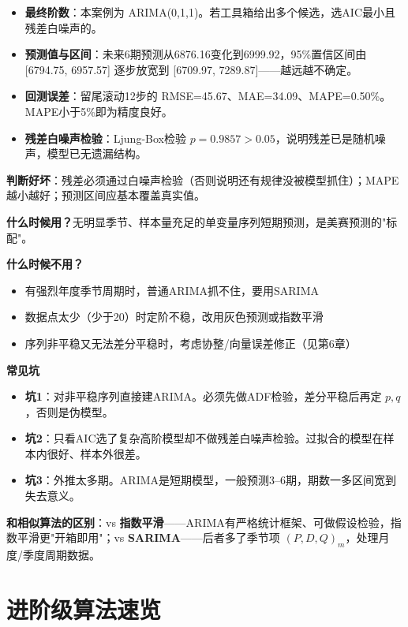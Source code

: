 \begin{algoresult}
\begin{itemize}
    \item \textbf{最终阶数}：本案例为 ARIMA(0,1,1)。若工具箱给出多个候选，选AIC最小且残差白噪声的。
    \item \textbf{预测值与区间}：未来6期预测从6876.16变化到6999.92，95\%置信区间由 [6794.75, 6957.57] 逐步放宽到 [6709.97, 7289.87]——越远越不确定。
    \item \textbf{回测误差}：留尾滚动12步的 RMSE=45.67、MAE=34.09、MAPE=0.50\%。MAPE小于5\%即为精度良好。
    \item \textbf{残差白噪声检验}：Ljung-Box检验 $p=0.9857>0.05$，说明残差已是随机噪声，模型已无遗漏结构。
\end{itemize}

\textbf{判断好坏}：残差必须通过白噪声检验（否则说明还有规律没被模型抓住）；MAPE越小越好；预测区间应基本覆盖真实值。
\end{algoresult}

\begin{algonotes}
\textbf{什么时候用？}无明显季节、样本量充足的单变量序列短期预测，是美赛预测的"标配"。

\textbf{什么时候不用？}
\begin{itemize}
    \item 有强烈年度季节周期时，普通ARIMA抓不住，要用SARIMA
    \item 数据点太少（少于20）时定阶不稳，改用灰色预测或指数平滑
    \item 序列非平稳又无法差分平稳时，考虑协整/向量误差修正（见第6章）
\end{itemize}

\textbf{常见坑}
\begin{itemize}
    \item \textbf{坑1}：对非平稳序列直接建ARIMA。必须先做ADF检验，差分平稳后再定 $p,q$，否则是伪模型。
    \item \textbf{坑2}：只看AIC选了复杂高阶模型却不做残差白噪声检验。过拟合的模型在样本内很好、样本外很差。
    \item \textbf{坑3}：外推太多期。ARIMA是短期模型，一般预测3--6期，期数一多区间宽到失去意义。
\end{itemize}

\textbf{和相似算法的区别}：vs \textbf{指数平滑}——ARIMA有严格统计框架、可做假设检验，指数平滑更"开箱即用"；vs \textbf{SARIMA}——后者多了季节项 $(P,D,Q)_m$，处理月度/季度周期数据。
\end{algonotes}

\section{进阶级算法速览}

